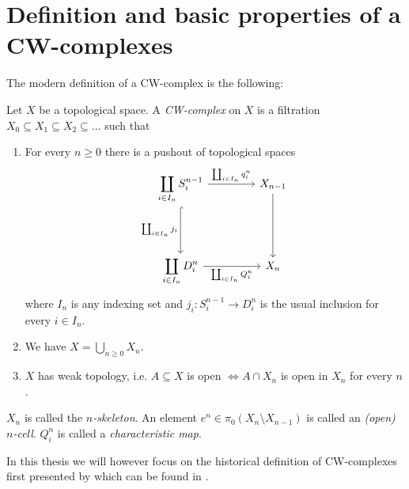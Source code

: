 \section{Definition and basic properties of a CW-complexes}
\label{sec:mathsdef}

The modern definition of a CW-complex is the following:

\begin{defi}\label{defi:CWComplex1}
    Let $X$ be a topological space.
    A \emph{CW-complex} on $X$ is a filtration
    $X_0 \subseteq X_1 \subseteq X_2 \subseteq \dots$ such that
    \begin{enumerate}
        \item For every $n \ge 0$ there is a pushout of topological spaces
            \[
            \begin{tikzcd}[row sep = 1.5cm, column sep = 1.5cm]
                \displaystyle \coprod_{i \in I_n}S_i^{n - 1} \arrow[r, "\coprod_{i \in I_n}q_i^n"] \arrow[d, hook, "\coprod_{i \in I_n} j_i"'] & X_{n- 1} \arrow[d] \\
                \displaystyle \coprod_{i \in I_n}D_i^n \arrow[r, "\coprod_{i \in I_n} Q_i^n"'] & X_n
            \end{tikzcd}
            \]
            where $I_n$ is any indexing set and $j_i \colon S_i^{n - 1} \to D_i^n$ is the usual inclusion for every $i \in I_n$.
        \item We have $X = \bigcup_{n \ge 0} X_n$.
        \item $X$ has weak topology, i.e. $A \subseteq X$ is open $\iff A \cap X_n$ is open in $X_n$ for every $n$.
    \end{enumerate}
    $X_n$ is called the \emph{$n$-skeleton}.
    An element $e^n \in \pi_0 (X_n \setminus X_{n - 1})$ is called an \emph{(open) $n$-cell}.
    $Q_i^n$ is called a \emph{characteristic map}.
\end{defi}


In this thesis we will however focus on the historical definition of CW-complexes first presented by  which can be found in \cite{Whitehead2018}.

